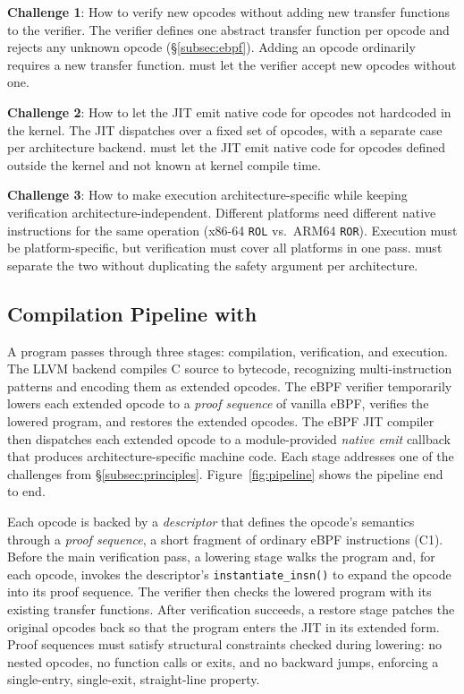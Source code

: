 \noindent\textbf{Challenge 1}: How to verify new opcodes without adding new transfer functions to the verifier. The verifier defines one abstract transfer function per opcode and rejects any unknown opcode (\S\ref{subsec:ebpf}). Adding an opcode ordinarily requires a new transfer function. \lang must let the verifier accept new opcodes without one.

\noindent\textbf{Challenge 2}: How to let the JIT emit native code for opcodes not hardcoded in the kernel. The JIT dispatches over a fixed set of opcodes, with a separate case per architecture backend. \lang must let the JIT emit native code for opcodes defined outside the kernel and not known at kernel compile time.

\noindent\textbf{Challenge 3}: How to make execution architecture-specific while keeping verification architecture-independent. Different platforms need different native instructions for the same operation (x86-64 \texttt{ROL} vs.\ ARM64 \texttt{ROR}). Execution must be platform-specific, but verification must cover all platforms in one pass. \lang must separate the two without duplicating the safety argument per architecture.

\subsection{Compilation Pipeline with \lang}
\label{subsec:pipeline}

A \lang program passes through three stages: compilation, verification, and execution. The LLVM backend compiles C source to \lang bytecode, recognizing multi-instruction patterns and encoding them as extended opcodes. The eBPF verifier temporarily lowers each extended opcode to a \emph{proof sequence} of vanilla eBPF, verifies the lowered program, and restores the extended opcodes. The eBPF JIT compiler then dispatches each extended opcode to a module-provided \emph{native emit} callback that produces architecture-specific machine code. Each stage addresses one of the challenges from \S\ref{subsec:principles}. Figure~\ref{fig:pipeline} shows the pipeline end to end.



Each \lang opcode is backed by a \emph{descriptor} that defines the opcode's semantics through a \emph{proof sequence}, a short fragment of ordinary eBPF instructions (C1). Before the main verification pass, a lowering stage walks the program and, for each \lang opcode, invokes the descriptor's \texttt{instantiate\_insn()} to expand the opcode into its proof sequence. The verifier then checks the lowered program with its existing transfer functions. After verification succeeds, a restore stage patches the original \lang opcodes back so that the program enters the JIT in its extended form. Proof sequences must satisfy structural constraints checked during lowering: no nested \lang opcodes, no function calls or exits, and no backward jumps, enforcing a single-entry, single-exit, straight-line property.

